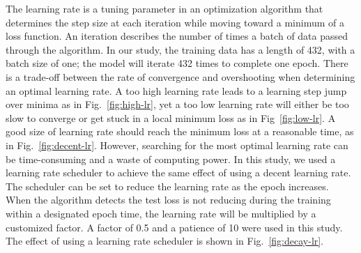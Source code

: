The learning rate is a tuning parameter in an optimization algorithm that determines the step size at each iteration while moving toward a minimum of a loss function. An iteration describes the number of times a batch of data passed through the algorithm. In our study, the training data has a length of 432, with a batch size of one; the model will iterate 432 times to complete one epoch. There is a trade-off between the rate of convergence and overshooting when determining an optimal learning rate. A too high learning rate leads to a learning step jump over minima as in Fig.~\ref{fig:high-lr}, yet a too low learning rate will either be too slow to converge or get stuck in a local minimum loss as in Fig~\ref{fig:low-lr}. A good size of learning rate should reach the minimum loss at a reasonable time, as in Fig.~\ref{fig:decent-lr}. However, searching for the most optimal learning rate can be time-consuming and a waste of computing power. In this study, we used a learning rate scheduler to achieve the same effect of using a decent learning rate. The scheduler can be set to reduce the learning rate as the epoch increases. When the algorithm detects the test loss is not reducing during the training within a designated epoch time, the learning rate will be multiplied by a customized factor. A factor of 0.5 and a patience of 10 were used in this study. The effect of using a learning rate scheduler is shown in Fig.~\ref{fig:decay-lr}.


